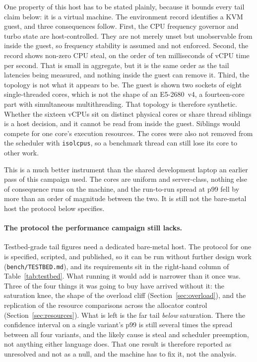 \documentclass[english,oneside,a4paper,censored,csm,software-track-2020]{HYthesisML}
\begin{document}
One property of this host has to be stated plainly, because it bounds every tail claim below: it
is a virtual machine. The environment record identifies a KVM guest, and three consequences
follow. First, the CPU frequency governor and turbo state are host-controlled. They are not
merely unset but unobservable from inside the guest, so frequency stability is assumed and not
enforced. Second, the record shows non-zero CPU steal, on the order of ten milliseconds of vCPU
time per second. That is small in aggregate, but it is the same order as the tail latencies being
measured, and nothing inside the guest can remove it. Third, the topology is not what it appears
to be. The guest is shown two
sockets of eight single-threaded cores, which is not the shape of an E5-2680~v4, a fourteen-core
part with simultaneous multithreading. That topology is therefore synthetic. Whether the
sixteen vCPUs sit on distinct physical cores or share thread siblings is a host decision, and it
cannot be read from inside the guest. Siblings would compete for one core's execution resources.
The cores were also not removed from the scheduler with
\texttt{isolcpus}, so a benchmark thread can still lose its core to other work.

This is a much better instrument than the shared development laptop an earlier pass of this
campaign used. The cores are uniform and server-class, nothing else of
consequence runs on the machine, and the run-to-run spread at p99 fell by more than an order
of magnitude between the two. It is still not the bare-metal host the protocol below specifies.

\paragraph{The protocol the performance campaign still lacks.}
Testbed-grade tail figures need a dedicated bare-metal host. The protocol for one is
specified, scripted, and published, so it can be run without further design work
(\texttt{bench/TESTBED.md}), and its requirements sit in the right-hand column of
Table~\ref{tab:testbed}. What running it would add is narrower than it once was. Three of the
four things it was going to buy have arrived without it: the saturation knee, the shape of
the overload cliff
(Section~\ref{sec:overload}), and the replication of the resource comparisons across the allocator
control (Section~\ref{sec:resources}). What is left is the far tail \emph{below} saturation.
There the confidence interval on a single variant's p99 is still several times the spread between
all four variants, and the likely cause is steal and scheduler preemption, not
anything either language does. That one result is therefore reported as unresolved and not as
a null, and the machine has to fix it, not the analysis.
\end{document}
